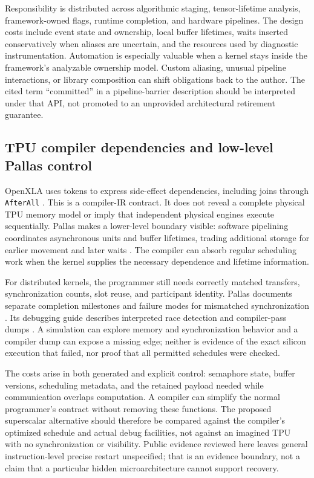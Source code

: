 Responsibility is distributed across algorithmic staging, tensor-lifetime analysis, framework-owned flags, runtime completion, and hardware pipelines. The design costs include event state and ownership, local buffer lifetimes, waits inserted conservatively when aliases are uncertain, and the resources used by diagnostic instrumentation. Automation is especially valuable when a kernel stays inside the framework's analyzable ownership model. Custom aliasing, unusual pipeline interactions, or library composition can shift obligations back to the author. The cited term ``committed'' in a pipeline-barrier description should be interpreted under that API, not promoted to an unprovided architectural retirement guarantee.

\subsection{TPU compiler dependencies and low-level Pallas control}

OpenXLA uses tokens to express side-effect dependencies, including joins through \texttt{AfterAll} \citep{u007_xla_tokens}. This is a compiler-IR contract. It does not reveal a complete physical TPU memory model or imply that independent physical engines execute sequentially. Pallas makes a lower-level boundary visible: software pipelining coordinates asynchronous units and buffer lifetimes, trading additional storage for earlier movement and later waits \citep{u007_pallas_pipeline}. The compiler can absorb regular scheduling work when the kernel supplies the necessary dependence and lifetime information.

For distributed kernels, the programmer still needs correctly matched transfers, synchronization counts, slot reuse, and participant identity. Pallas documents separate completion milestones and failure modes for mismatched synchronization \citep{u007_pallas_distributed}. Its debugging guide describes interpreted race detection and compiler-pass dumps \citep{u007_pallas_debug}. A simulation can explore memory and synchronization behavior and a compiler dump can expose a missing edge; neither is evidence of the exact silicon execution that failed, nor proof that all permitted schedules were checked.

The costs arise in both generated and explicit control: semaphore state, buffer versions, scheduling metadata, and the retained payload needed while communication overlaps computation. A compiler can simplify the normal programmer's contract without removing these functions. The proposed superscalar alternative should therefore be compared against the compiler's optimized schedule and actual debug facilities, not against an imagined TPU with no synchronization or visibility. Public evidence reviewed here leaves general instruction-level precise restart unspecified; that is an evidence boundary, not a claim that a particular hidden microarchitecture cannot support recovery.

